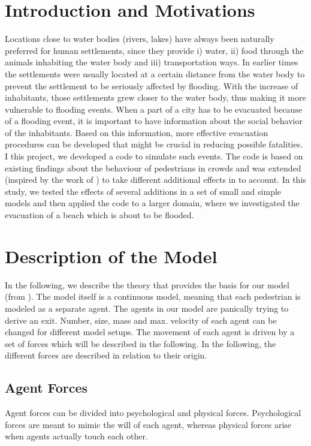 \documentclass[11pt]{article}
\begin{document}
\section{Introduction and Motivations}
Locations close to water bodies (rivers, lakes) have always been naturally preferred for human settlements, since they provide i) water, ii) food through the animals inhabiting the water body and iii) transportation ways. In earlier times the settlements were usually located at a certain distance from the water body to prevent the settlement to be seriously affected by flooding. With the increase of inhabitants, those settlements grew closer to the water body, thus making it more vulnerable to flooding events.
When a part of a city has to be evacuated because of a flooding event, it is important to have information about the social behavior of the inhabitants. Based on this information, more effective evacuation procedures can be developed that might be crucial in reducing possible fatalities.
I this project, we developed a code to simulate such events. The code is based on existing findings about the behaviour of pedestrians in crowds and was extended (inspired by the work of \citet{HeerBuehler}) to take different additional effects in to account. In this study, we tested the effects of several additions in a set of small and simple models and then applied the code to a larger domain, where we investigated the evacuation of a beach which is about to be flooded. 
\section{Description of the Model}
In the following, we describe the theory that provides the basis for our model (from \citet{Helbing2000}). The model itself is a continuous model, meaning that each pedestrian is modeled as a separate agent. The agents in our model are panically trying to derive an exit. Number, size, mass and max. velocity of each agent can be changed for different model setups. The movement of each agent is driven by a set of forces which will be described in the following. In the following, the different forces are described in relation to their origin.
\subsection{Agent Forces}
Agent forces can be divided into psychological and physical forces. Psychological forces are meant to mimic the will of each agent, whereas physical forces arise when agents actually touch each other.
\end{document}
